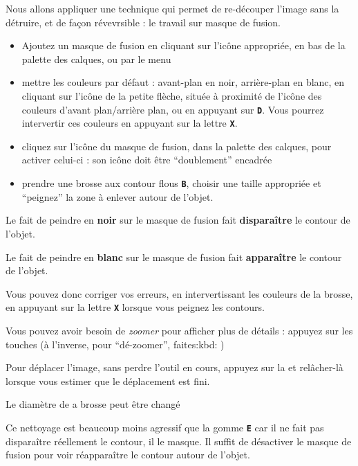 \documentclass[a4paper,12pt,french]{sphinxmanual}
\begin{document}
Nous allons appliquer une technique qui permet de re-découper l'image sans la détruire, et de façon révevrsible : le travail sur masque de fusion.
\begin{itemize}
\item {} 
Ajoutez un masque de fusion en cliquant sur l'icône appropriée, en bas de la palette des calques, ou par le menu 

\item {} 
mettre les couleurs par défaut : avant-plan en noir, arrière-plan en blanc, en cliquant sur l'icône de la petite flèche, située à proximité de l'icône des couleurs d'avant plan/arrière plan, ou en appuyant sur \textbf{\texttt{D}}. Vous pourrez intervertir ces couleurs en appuyant sur la lettre \textbf{\texttt{X}}.

\item {} 
cliquez sur l'icône du masque de fusion, dans la palette des calques, pour activer celui-ci : son icône doit être ``doublement'' encadrée

\item {} 
prendre une brosse aux contour flous \textbf{\texttt{B}}, choisir une taille appropriée  et ``peignez'' la zone à enlever autour de l'objet.

\end{itemize}

Le fait de peindre en \textbf{noir} sur le masque de fusion fait \textbf{disparaître} le contour de l'objet.

Le fait de peindre en \textbf{blanc} sur le masque de fusion fait \textbf{apparaître} le contour de l'objet.

Vous pouvez donc corriger vos erreurs, en intervertissant les couleurs de la brosse, en appuyant sur la lettre \textbf{\texttt{X}} lorsque vous peignez les contours.

Vous pouvez avoir besoin de \emph{zoomer} pour afficher plus de détails : appuyez sur les touches  (à l'inverse, pour ``dé-zoomer'', faites:kbd: )

Pour déplacer l'image, sans perdre l'outil en cours, appuyez sur la  et relâcher-là lorsque vous estimer que le déplacement est fini.

Le diamètre de a brosse peut être changé

Ce nettoyage est beaucoup moins agressif que la gomme \textbf{\texttt{E}} car il ne fait pas disparaître réellement le contour, il le masque. Il suffit de désactiver le masque de fusion pour voir réapparaître le contour autour de l'objet.
\end{document}
